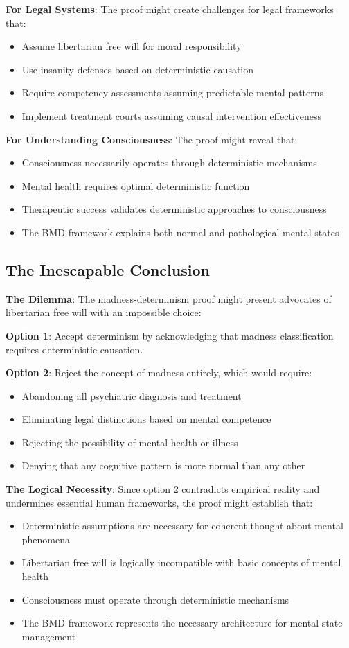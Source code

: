 \documentclass[12pt]{article}
\begin{document}
\textbf{For Legal Systems}: The proof might create challenges for legal frameworks that:
\begin{itemize}
\item Assume libertarian free will for moral responsibility
\item Use insanity defenses based on deterministic causation
\item Require competency assessments assuming predictable mental patterns
\item Implement treatment courts assuming causal intervention effectiveness
\end{itemize}

\textbf{For Understanding Consciousness}: The proof might reveal that:
\begin{itemize}
\item Consciousness necessarily operates through deterministic mechanisms
\item Mental health requires optimal deterministic function
\item Therapeutic success validates deterministic approaches to consciousness
\item The BMD framework explains both normal and pathological mental states
\end{itemize}

\subsection{The Inescapable Conclusion}

\textbf{The Dilemma}: The madness-determinism proof might present advocates of libertarian free will with an impossible choice:

\textbf{Option 1}: Accept determinism by acknowledging that madness classification requires deterministic causation.

\textbf{Option 2}: Reject the concept of madness entirely, which would require:
\begin{itemize}
\item Abandoning all psychiatric diagnosis and treatment
\item Eliminating legal distinctions based on mental competence
\item Rejecting the possibility of mental health or illness
\item Denying that any cognitive pattern is more normal than any other
\end{itemize}

\textbf{The Logical Necessity}: Since option 2 contradicts empirical reality and undermines essential human frameworks, the proof might establish that:
\begin{itemize}
\item Deterministic assumptions are necessary for coherent thought about mental phenomena
\item Libertarian free will is logically incompatible with basic concepts of mental health
\item Consciousness must operate through deterministic mechanisms
\item The BMD framework represents the necessary architecture for mental state management
\end{itemize}
\end{document}

